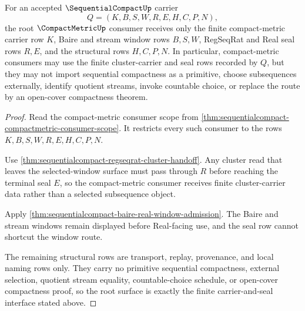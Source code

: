 \begin{theorem}
\label{thm:sequentialcompact-compactmetric-root-unblock}
For an accepted $\SequentialCompactUp$ carrier
$$
Q=(K,B,S,W,R,E,H,C,P,N),
$$
the root $\CompactMetricUp$ consumer receives only the finite compact-metric carrier row $K$, Baire and stream window rows $B,S,W$, RegSeqRat and Real seal rows $R,E$, and the structural rows $H,C,P,N$. In particular, compact-metric consumers may use the finite cluster-carrier and seal rows recorded by $Q$, but they may not import sequential compactness as a primitive, choose subsequences externally, identify quotient streams, invoke countable choice, or replace the route by an open-cover compactness theorem.
\end{theorem}
\begin{proof}
Read the compact-metric consumer scope from \autoref{thm:sequentialcompact-compactmetric-consumer-scope}. It restricts every such consumer to the rows $K,B,S,W,R,E,H,C,P,N$.

Use \autoref{thm:sequentialcompact-regseqrat-cluster-handoff}. Any cluster read that leaves the selected-window surface must pass through $R$ before reaching the terminal seal $E$, so the compact-metric consumer receives finite cluster-carrier data rather than a selected subsequence object.

Apply \autoref{thm:sequentialcompact-baire-real-window-admission}. The Baire and stream windows remain displayed before Real-facing use, and the seal row cannot shortcut the window route.

The remaining structural rows are transport, replay, provenance, and local naming rows only. They carry no primitive sequential compactness, external selection, quotient stream equality, countable-choice schedule, or open-cover compactness proof, so the root surface is exactly the finite carrier-and-seal interface stated above.
\end{proof}

